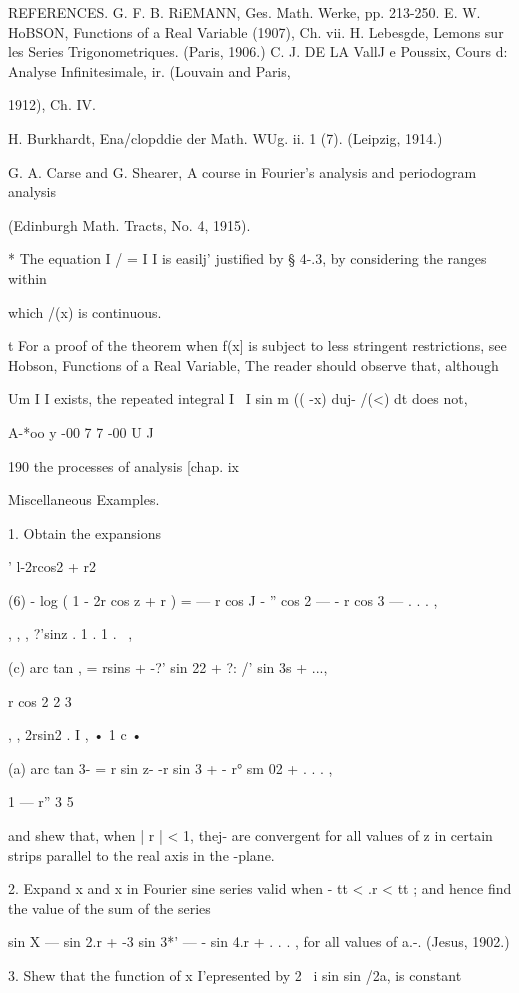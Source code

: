 {REFERENCES. G. F. B. RiEMANN, Ges. Math. Werke, pp. 213-250. E. W.
HoBSON, Functions of a Real Variable (1907), Ch. vii. H. Lebesgde,
Lemons sur les Series Trigonometriques. (Paris, 1906.) C. J. DE LA
VallJ e Poussix, Cours d: Analyse Infinitesimale, ir. (Louvain and
Paris,

1912), Ch. IV.

H. Burkhardt, Ena/clopddie der Math. WUg. ii. 1 (7). (Leipzig, 1914.)

G. A. Carse and G. Shearer, A course in Fourier's analysis and
periodogram analysis

(Edinburgh Math. Tracts, No. 4, 1915).

* The equation I / = I I is easilj' justified by § 4-.3, by
considering the ranges within

which /(x) is continuous.

t For a proof of the theorem when f(x] is subject to less stringent
restrictions, see Hobson, Functions of a Real Variable, %
The reader should observe that, although

Um I I exists, the repeated integral I \ I sin m (( -x) duj- /(<) dt
does not,

A-*oo y -00 7 7 -00 U J

190 the processes of analysis [chap. ix

Miscellaneous Examples.

1. Obtain the expansions

  ' l-2rcos2 + r2

(6) - log ( 1 - 2r cos z + r ) = — r cos J - '' cos 2 — - r cos 3 — .
. . ,

, , , ?'sinz . 1 . 1 . \ ,

(c) arc tan , = rsins + -?' sin 22 + ?: /' sin 3s + ...,

   r cos 2 2 3

, , 2rsin2 . I , • 1 c •

(a) arc tan 3- = r sin z- -r sin 3 + - r° sm 02 + . . . ,

1 — r'' 3 5

and shew that, when | r | < 1, thej- are convergent for all values of
z in certain strips parallel to the real axis in the -plane.

2. Expand x and x in Fourier sine series valid when - tt < .r < tt ;
and hence find the value of the sum of the series

sin X — sin 2.r + -3 sin 3*' — - sin 4.r + . . . , for all values of
a.-. (Jesus, 1902.)

3. Shew that the function of x I'epresented by 2 ~i sin sin /2a, is
constant

}
